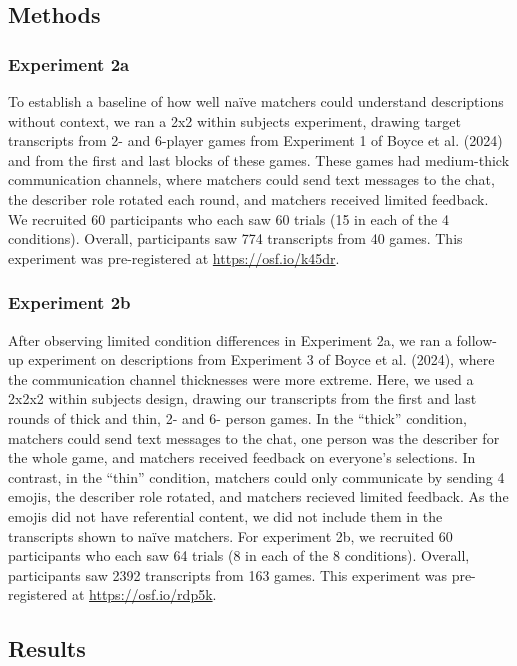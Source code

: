 \documentclass[10pt, letterpaper]{article}
\begin{document}
\subsection{Methods}\label{methods-1}

\subsubsection{Experiment 2a}\label{experiment-2a}

To establish a baseline of how well naïve matchers could understand
descriptions without context, we ran a 2x2 within subjects experiment,
drawing target transcripts from 2- and 6-player games from Experiment 1
of Boyce et al. (2024) and from the first and last blocks of these
games. These games had medium-thick communication channels, where
matchers could send text messages to the chat, the describer role
rotated each round, and matchers received limited feedback. We recruited
60 participants who each saw 60 trials (15 in each of the 4 conditions).
Overall, participants saw 774 transcripts from 40 games. This experiment
was pre-registered at \url{https://osf.io/k45dr}.

\subsubsection{Experiment 2b}\label{experiment-2b}

After observing limited condition differences in Experiment 2a, we ran a
follow-up experiment on descriptions from Experiment 3 of Boyce et al.
(2024), where the communication channel thicknesses were more extreme.
Here, we used a 2x2x2 within subjects design, drawing our transcripts
from the first and last rounds of thick and thin, 2- and 6- person
games. In the ``thick'' condition, matchers could send text messages to
the chat, one person was the describer for the whole game, and matchers
received feedback on everyone's selections. In contrast, in the ``thin''
condition, matchers could only communicate by sending 4 emojis, the
describer role rotated, and matchers recieved limited feedback. As the
emojis did not have referential content, we did not include them in the
transcripts shown to naïve matchers. For experiment 2b, we recruited 60
participants who each saw 64 trials (8 in each of the 8 conditions).
Overall, participants saw 2392 transcripts from 163 games. This
experiment was pre-registered at \url{https://osf.io/rdp5k}.

\subsection{Results}\label{results}
\end{document}
